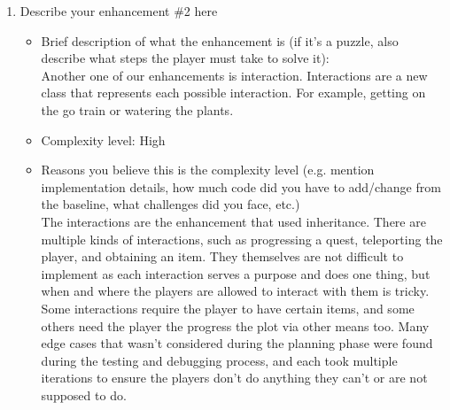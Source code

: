 \documentclass[11pt]{article}
\begin{document}
\begin{enumerate}
\item Describe your enhancement \#2 here
	\begin{itemize}
	\item Brief description of what the enhancement is (if it's a puzzle, also describe what steps the player must take to solve it):
 \\Another one of our enhancements is interaction. Interactions are a new class that represents each possible interaction. For example, getting on the go train or watering the plants.  
	\item Complexity level: High
	\item Reasons you believe this is the complexity level (e.g. mention implementation details, how much code did you have to add/change from the baseline, what challenges did you face, etc.)
 \\The interactions are the enhancement that used inheritance. There are multiple kinds of interactions, such as progressing a quest, teleporting the player, and obtaining an item. They themselves are not difficult to implement as each interaction serves a purpose and does one thing, but when and where the players are allowed to interact with them is tricky. Some interactions require the player to have certain items, and some others need the player the progress the plot via other means too. Many edge cases that wasn't considered during the planning phase were found during the testing and debugging process, and each took multiple iterations to ensure the players don't do anything they can't or are not supposed to do.  

\end{itemize}
 

\end{enumerate}
\end{document}
